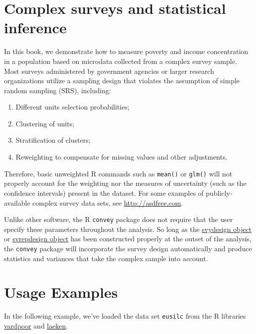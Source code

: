 \documentclass[]{book}
\providecommand{\tightlist}{%
  \setlength{\itemsep}{0pt}\setlength{\parskip}{0pt}}
\begin{document}
\section{Complex surveys and statistical inference}\label{survey}

In this book, we demonstrate how to measure poverty and income
concentration in a population based on microdata collected from a
complex survey sample. Most surveys administered by government agencies
or larger research organizations utilize a sampling design that violates
the assumption of simple random sampling (SRS), including:

\begin{enumerate}
\def\labelenumi{\arabic{enumi}.}
\tightlist
\item
  Different units selection probabilities;
\item
  Clustering of units;
\item
  Stratification of clusters;
\item
  Reweighting to compensate for missing values and other adjustments.
\end{enumerate}

Therefore, basic unweighted R commands such as \texttt{mean()} or
\texttt{glm()} will not properly account for the weighting nor the
measures of uncertainty (such as the confidence intervals) present in
the dataset. For some examples of publicly-available complex survey data
sets, see \href{}{http://asdfree.com}.

Unlike other software, the R \texttt{convey} package does not require
that the user specify these parameters throughout the analysis. So long
as the
\href{http://r-survey.r-forge.r-project.org/survey/html/svydesign.html}{svydesign
object} or
\href{http://r-survey.r-forge.r-project.org/survey/html/svrepdesign.html}{svrepdesign
object} has been constructed properly at the outset of the analysis, the
\texttt{convey} package will incorporate the survey design automatically
and produce statistics and variances that take the complex sample into
account.

\section{Usage Examples}\label{usage-examples}

In the following example, we've loaded the data set \texttt{eusilc} from
the R libraries
\href{https://CRAN.R-project.org/package=vardpoor}{vardpoor} and
\href{https://CRAN.R-project.org/package=laeken}{laeken}.
\end{document}
